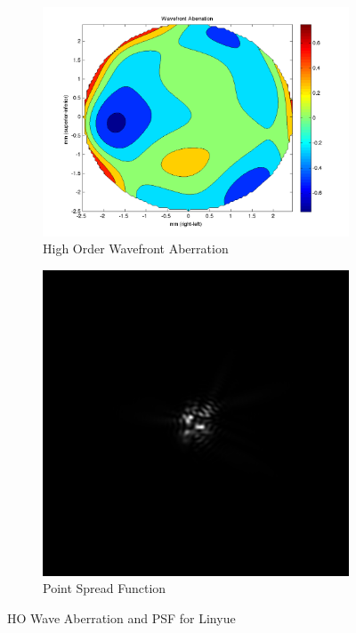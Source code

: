 \documentclass{article}
\begin{document}
\begin{figure}[H]
\begin{subfigure}{.5\textwidth}
  \centering
  \includegraphics[width=1\linewidth]{Linyue_WFA.png}
  \caption{High Order Wavefront Aberration}
  \label{fig:linyuehowa}
\end{subfigure}%
\begin{subfigure}{.5\textwidth}
  \centering
  \includegraphics[width=.8\linewidth]{Linyue_PSF.png}
  \caption{Point Spread Function}
  \label{fig:linyuepsf}
\end{subfigure}
\caption{HO Wave Aberration and PSF for Linyue}
\label{fig:linyue}
\end{figure}
\end{document}
